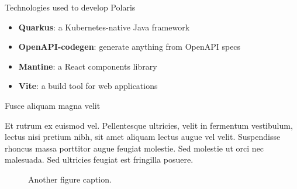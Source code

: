 \documentclass[final]{beamer}
\newlength{\colwidth}
\begin{document}
\begin{frame}[t]
\begin{columns}[t]
\begin{column}{\colwidth}
\begin{block}{Technologies used to develop Polaris}
                    \begin{itemize}
                        \item \textbf{Quarkus}: a Kubernetes-native Java framework
                        \item \textbf{OpenAPI-codegen}: generate anything from OpenAPI specs
                        \item \textbf{Mantine}: a React components library
                        \item \textbf{Vite}: a build tool for web applications
                    \end{itemize}

                \end{block}

                \begin{block}{Fusce aliquam magna velit}

                    Et rutrum ex euismod vel. Pellentesque ultricies, velit in fermentum
                    vestibulum, lectus nisi pretium nibh, sit amet aliquam lectus augue vel
                    velit. Suspendisse rhoncus massa porttitor augue feugiat molestie. Sed
                    molestie ut orci nec malesuada. Sed ultricies feugiat est fringilla
                    posuere.

                    \begin{figure}
                        \centering
                        \caption{Another figure caption.}
                    \end{figure}

                \end{block}

            \end{column}


\end{columns}
\end{frame}
\end{document}
